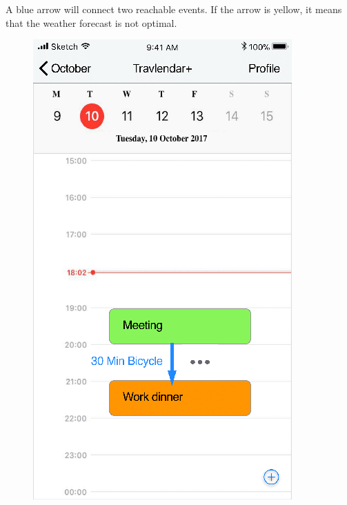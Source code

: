 A blue arrow will connect two reachable events. If the arrow is yellow, it means that the weather forecast is not optimal.
\begin{figure}[H]
	\centering
	\includegraphics[scale=0.23]{Images/Interface/Weather_Forecast/1_optimal}
	\hspace{0.5cm}

\end{figure}
